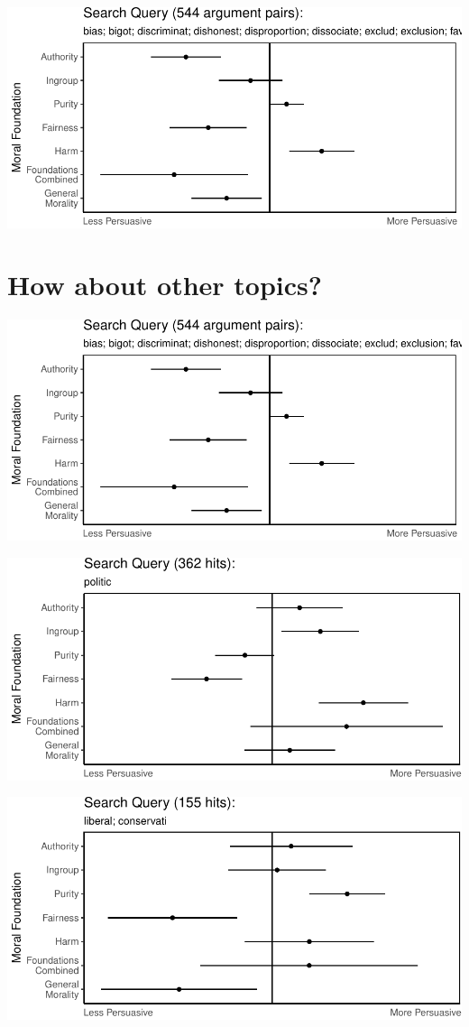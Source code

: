 \documentclass[11pt,]{article}
\begin{document}
\includegraphics{prelim_files/figure-latex/unnamed-chunk-14-1.pdf}

\section{How about other topics?}\label{how-about-other-topics}

\includegraphics{prelim_files/figure-latex/unnamed-chunk-15-1.pdf}

\includegraphics{prelim_files/figure-latex/unnamed-chunk-16-1.pdf}

\includegraphics{prelim_files/figure-latex/unnamed-chunk-17-1.pdf}
\end{document}
